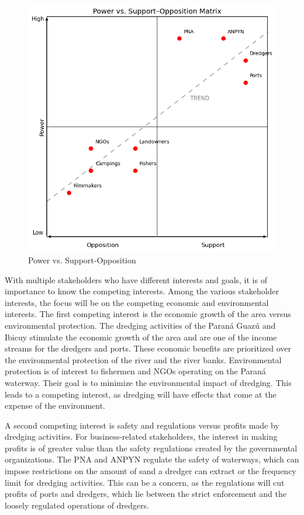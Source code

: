 \begin{figure}[H]
    \centering
    \includegraphics[width=0.65\linewidth]{figures/ch3/Support-OppositionVSPower.png}
    \caption{Power vs. Support-Opposition}
    \label{fig:support-opposition-power}
\end{figure}

With multiple stakeholders who have different interests and goals, it is of importance to know the competing interests. Among the various stakeholder interests, the focus will be on the competing economic and environmental interests. The first competing interest is the economic growth of the area versus environmental protection. The dredging activities of the Paraná Guazú and Ibicuy stimulate the economic growth of the area and are one of the income streams for the dredgers and ports. These economic benefits are prioritized over the environmental protection of the river and the river banks. Environmental protection is of interest to fishermen and NGOs operating on the Paraná waterway. Their goal is to minimize the environmental impact of dredging. This leads to a competing interest, as dredging will have effects that come at the expense of the environment.

A second competing interest is  safety and regulations versus  profits made by dredging activities. For business-related stakeholders, the interest in making profits is of greater value than the safety regulations created by the governmental organizations. The PNA and ANPYN regulate the safety of waterways, which can impose restrictions on the amount of sand a dredger can extract or the frequency limit for dredging activities. This can be a concern, as the regulations will cut profits of ports and dredgers, which lie between the strict enforcement and the loosely regulated operations of dredgers.

